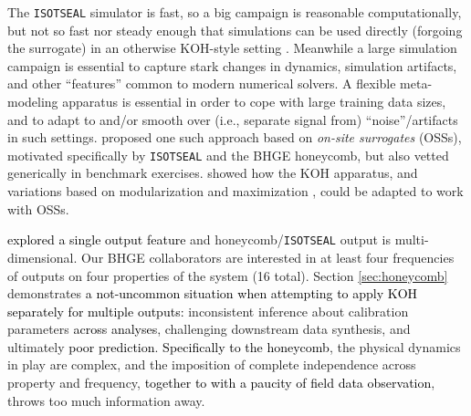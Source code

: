 \documentclass[12pt]{article}
\newcommand{\blunew}[1]{\textcolor{black}{#1}} %
\begin{document}
The {\tt ISOTSEAL} simulator is fast, so a big campaign is reasonable
computationally, but not so fast nor steady enough that simulations can be
used directly (forgoing the surrogate) in an otherwise KOH-style
setting \citep{Higdon:2004}.  Meanwhile a large simulation campaign is
essential to capture stark changes in dynamics, simulation artifacts, and
other ``features'' common to modern numerical solvers.  A
flexible meta-modeling apparatus is essential in order to cope with large
training data sizes, and to adapt to and/or smooth over (i.e., separate signal
from) ``noise''/artifacts in such settings.  \citet{Huang:2018} proposed one
such approach based on {\em on-site surrogates} (OSSs), motivated specifically
by {\tt ISOTSEAL} and the BHGE honeycomb, but also vetted generically in
benchmark exercises.  \citeauthor{Huang:2018} showed how the KOH apparatus,
and variations based on modularization \citep{Liu:2009} and maximization
\citep{gra:etal:2015}, could be adapted to work with OSSs.

\blunew{\citeauthor{Huang:2018} explored a single output feature} and
honeycomb/{\tt ISOTSEAL} output is multi-dimensional. Our BHGE collaborators
are interested in at least four frequencies of outputs on four properties of
the system (16 total). Section \ref{sec:honeycomb} demonstrates \blunew{a
not-uncommon situation when attempting to apply KOH separately for
multiple outputs:} inconsistent inference about calibration parameters 
\blunew{across analyses}, challenging downstream data synthesis, and
ultimately \blunew{poor prediction}.  \blunew{Specifically to the honeycomb},
the physical dynamics in play are complex, and the imposition of complete
independence across property and frequency, \blunew{together to with a paucity
of field data observation}, throws too much information away.
\end{document}
